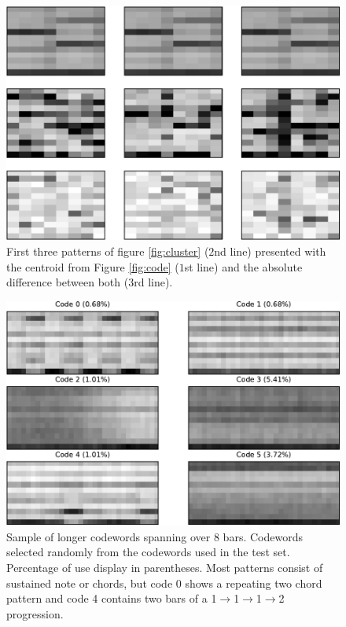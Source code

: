 \documentclass{article}
\begin{document}
\begin{figure}[htb]
\begin{center}
\includegraphics[width=.8\columnwidth]{close_patterns_diff}
\end{center}
\caption{\small{First three patterns of figure \ref{fig:cluster}
($2$nd line) presented with the centroid from Figure \ref{fig:code}
($1$st line) and the absolute difference between both ($3$rd line).
}}
\label{fig:cluster_diff}
\end{figure}

\begin{figure}[htb]
\begin{center}
\includegraphics[width=.8\columnwidth]{codes_8bars}
\end{center}
\caption{\small{Sample of longer codewords spanning over $8$
    bars. Codewords selected randomly from the codewords used in the
    test set. Percentage of use display in parentheses.  Most patterns
    consist of sustained note or chords, but code 0 shows a repeating
    two chord pattern and code 4 contains two bars of a
    1$\rightarrow$1$\rightarrow$1$\rightarrow$2 progression.}}
\label{fig:codes8bars}
\end{figure}
\end{document}
